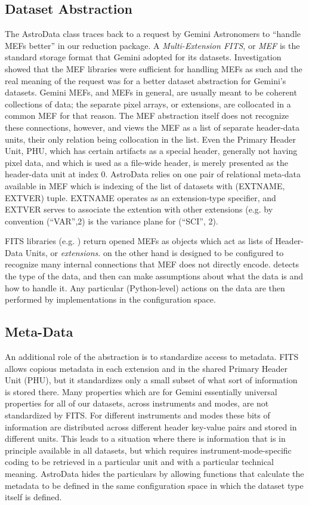 \documentclass[letterpaper,10pt,english]{sphinxmanual}
\begin{document}
\subsection{Dataset Abstraction}
\label{gen.ADMANUAL_ADConcepts:dataset-abstraction}
The AstroData class traces back to a request by Gemini Astronomers to
``handle MEFs better'' in our reduction package. A \emph{Multi-Extension FITS},
or \emph{MEF} is the standard storage format that Gemini adopted for its datasets.
Investigation showed that the MEF libraries were
sufficient for handling MEFs as such and the real meaning of the
request was for a better dataset abstraction for Gemini's datasets.
Gemini MEFs, and MEFs in general, are usually meant to be coherent
collections of data; the separate pixel arrays, or extensions, are
collocated in a common MEF for that reason. The MEF abstraction itself
does not recognize these connections, however, and views the MEF as a
list of separate header-data units, their only relation being
collocation in the list. Even the Primary Header Unit, PHU, which has certain artifacts as
a special header, generally not having pixel data, and which is used
as a file-wide header, is merely presented as the header-data unit at
index 0. AstroData relies on one pair of relational meta-data
available in MEF which is indexing of the list of datasets with
(EXTNAME, EXTVER) tuple. EXTNAME operates as an extension-type
specifier, and EXTVER serves to associate the extention with other
extensions (e.g. by convention (``VAR'',2) is the variance plane for
(``SCI'', 2).

FITS libraries (e.g. ) return opened MEFs as objects which act
as lists of Header-Data Units, or \emph{extensions}.  on the
other hand is designed to be configured to recognize many internal
connections that MEF does not directly encode.  detects the
type of the data, and then can make assumptions about what the
data is and how to handle it. Any particular (Python-level) actions on
the data are then performed by implementations in the configuration
space.


\subsection{Meta-Data}
\label{gen.ADMANUAL_ADConcepts:meta-data}
An additional role of the  abstraction is to standardize
access to metadata. FITS allows copious metadata in each extension and
in the shared Primary Header Unit (PHU), but it standardizes
only a small subset of what sort of information is stored there. Many
properties which are for Gemini essentially universal properties for
all of our datasets, across instruments and modes, are not
standardized by FITS. For different instruments and modes these bits
of information are distributed across different header key-value pairs
and stored in different units. This leads to a situation where there
is information that is in principle available in all datasets, but
which requires instrument-mode-specific coding to be retrieved in a
particular unit and with a particular technical meaning. AstroData
hides the particulars by allowing functions that calculate the
metadata to be defined in the same configuration space in which the
dataset type itself is defined.
\end{document}
